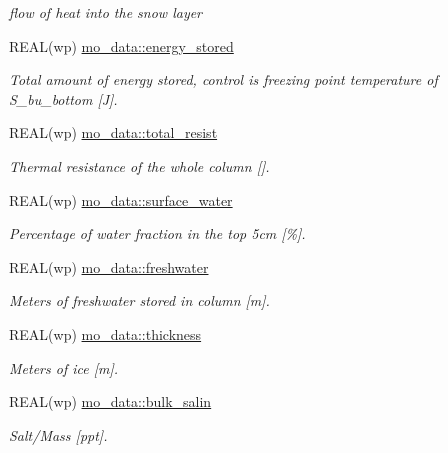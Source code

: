 \begin{DoxyCompactItemize}
\begin{DoxyCompactList}\small\item\em flow of heat into the snow layer \item\end{DoxyCompactList}\item 
REAL(wp) \hyperlink{namespacemo__data_aedd9ec4adc59bfcbf90402c4226f2f34}{mo\_\-data::energy\_\-stored}
\begin{DoxyCompactList}\small\item\em Total amount of energy stored, control is freezing point temperature of S\_\-bu\_\-bottom \mbox{[}J\mbox{]}. \item\end{DoxyCompactList}\item 
REAL(wp) \hyperlink{namespacemo__data_a71a192f5750717bc71df8f87c2a8cf52}{mo\_\-data::total\_\-resist}
\begin{DoxyCompactList}\small\item\em Thermal resistance of the whole column \mbox{[}\mbox{]}. \item\end{DoxyCompactList}\item 
REAL(wp) \hyperlink{namespacemo__data_a330cc0e4bc178ef722ccd333c69aa06d}{mo\_\-data::surface\_\-water}
\begin{DoxyCompactList}\small\item\em Percentage of water fraction in the top 5cm \mbox{[}\%\mbox{]}. \item\end{DoxyCompactList}\item 
REAL(wp) \hyperlink{namespacemo__data_a4c81fc09918e52dc51dfa99efbbac90b}{mo\_\-data::freshwater}
\begin{DoxyCompactList}\small\item\em Meters of freshwater stored in column \mbox{[}m\mbox{]}. \item\end{DoxyCompactList}\item 
REAL(wp) \hyperlink{namespacemo__data_aab72953060065beb7d6f1d2b9fcafa5c}{mo\_\-data::thickness}
\begin{DoxyCompactList}\small\item\em Meters of ice \mbox{[}m\mbox{]}. \item\end{DoxyCompactList}\item 
REAL(wp) \hyperlink{namespacemo__data_aadde2b57a3e8c60b5cd6f8a5ee72623d}{mo\_\-data::bulk\_\-salin}
\begin{DoxyCompactList}\small\item\em Salt/Mass \mbox{[}ppt\mbox{]}. \item\end{DoxyCompactList}\item 

\end{DoxyCompactItemize}
